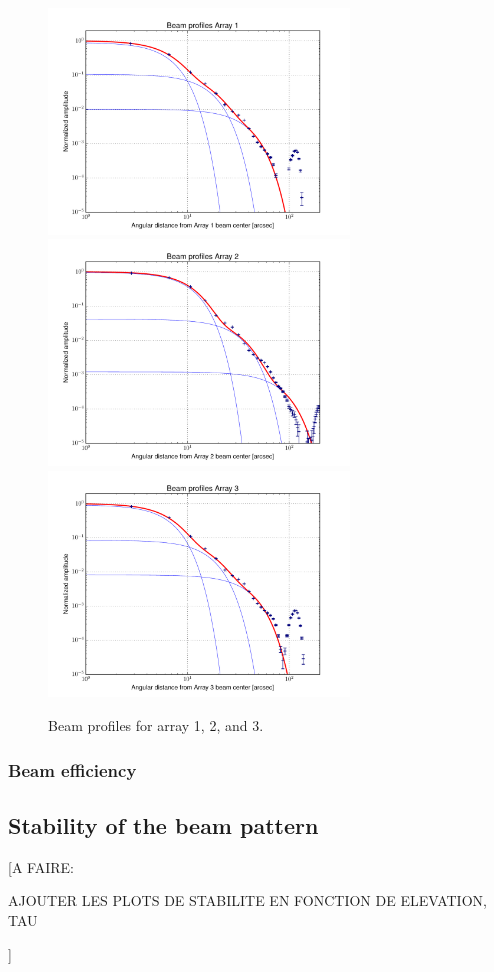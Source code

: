 \begin{figure}[h!]
\centering
\includegraphics[height=6cm]{Figures/Beam_profiles_A1_FR.pdf}
\hspace{0.5cm}
\includegraphics[height=6cm]{Figures/Beam_profiles_A2_FR.pdf}
\hspace{0.5cm}
\includegraphics[height=6cm]{Figures/Beam_profiles_A3_FR.pdf}
\caption{{\footnotesize Beam profiles for array 1, 2, and 3.}}
\label{fig:beam_profiles_3G}
\end{figure}


\subsubsection{Beam efficiency}


\subsection{Stability of the beam pattern}

[A FAIRE:

  AJOUTER LES PLOTS DE STABILITE EN FONCTION DE ELEVATION, TAU

]




